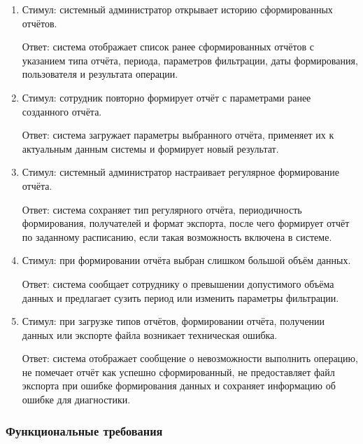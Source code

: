 \documentclass[12pt,a4paper]{article}
\begin{document}
\begin{enumerate}
		\item Стимул: системный администратор открывает историю сформированных отчётов.
		
		Ответ: система отображает список ранее сформированных отчётов с указанием
		типа отчёта, периода, параметров фильтрации, даты формирования, пользователя
		и результата операции.
		
		\item Стимул: сотрудник повторно формирует отчёт с параметрами ранее созданного
		отчёта.
		
		Ответ: система загружает параметры выбранного отчёта, применяет их к актуальным
		данным системы и формирует новый результат.
		
		\item Стимул: системный администратор настраивает регулярное формирование
		отчёта.
		
		Ответ: система сохраняет тип регулярного отчёта, периодичность формирования,
		получателей и формат экспорта, после чего формирует отчёт по заданному
		расписанию, если такая возможность включена в системе.
		
		\item Стимул: при формировании отчёта выбран слишком большой объём данных.
		
		Ответ: система сообщает сотруднику о превышении допустимого объёма данных
		и предлагает сузить период или изменить параметры фильтрации.
		
		\item Стимул: при загрузке типов отчётов, формировании отчёта, получении данных
		или экспорте файла возникает техническая ошибка.
		
		Ответ: система отображает сообщение о невозможности выполнить операцию,
		не помечает отчёт как успешно сформированный, не предоставляет файл экспорта
		при ошибке формирования данных и сохраняет информацию об ошибке для диагностики.
	\end{enumerate}
	
	\subsubsection{Функциональные требования}
	
\end{document}
